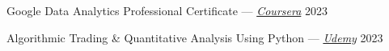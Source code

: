 
\vspace{0.4em}

\begin{zitemize}
    \item Google Data Analytics Professional Certificate --- \textit{\href{https://coursera.org/share/5d942651257bf9294edf54fe8b26c023}{Coursera}} \hfill 2023
    \item Algorithmic Trading \& Quantitative Analysis Using Python --- \textit{\href{https://www.udemy.com/certificate/UC-3d21bc2c-e132-4c08-a555-2b50d15b0f86/}{Udemy}} \hfill 2023
\end{zitemize}







